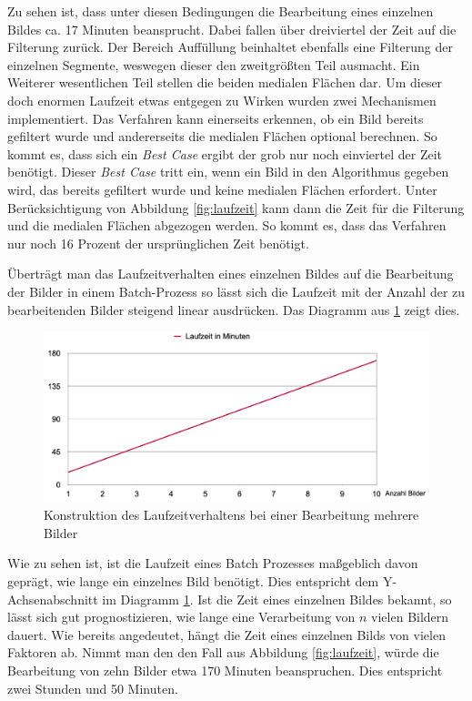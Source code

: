 Zu sehen ist, dass unter diesen Bedingungen die Bearbeitung eines einzelnen
Bildes ca. 17 Minuten beansprucht. Dabei fallen über dreiviertel der Zeit auf
die Filterung zurück. Der Bereich Auffüllung beinhaltet ebenfalls eine Filterung
der einzelnen Segmente, weswegen dieser den zweitgrößten Teil ausmacht. Ein Weiterer
wesentlichen Teil stellen die beiden medialen Flächen dar. Um dieser doch
enormen Laufzeit etwas entgegen zu Wirken wurden zwei Mechanismen implementiert.
Das Verfahren kann einerseits erkennen, ob ein Bild bereits gefiltert wurde und
andererseits die medialen Flächen optional berechnen. So kommt es, dass sich ein
\textit{Best Case} ergibt der grob nur noch einviertel der Zeit benötigt. Dieser
\textit{Best Case} tritt ein, wenn ein Bild in den Algorithmus gegeben wird, das
bereits gefiltert wurde und keine medialen Flächen erfordert. Unter
Berücksichtigung von Abbildung \ref{fig:laufzeit} kann dann die Zeit für die
Filterung und die medialen Flächen abgezogen werden. So kommt es, dass das
Verfahren nur noch 16 Prozent der ursprünglichen Zeit benötigt.

Überträgt man das Laufzeitverhalten eines einzelnen Bildes auf die Bearbeitung
der Bilder in einem Batch-Prozess so lässt sich die Laufzeit mit der Anzahl der
zu bearbeitenden Bilder steigend linear ausdrücken. Das Diagramm aus \ref{fig:laufzeit_batch}
zeigt dies.

\begin{figure}[h]
	\centering
	\includegraphics[width=1\textwidth]{img/runtimeBatch.png}
	\caption{Konstruktion des Laufzeitverhaltens bei einer Bearbeitung mehrere
	Bilder}
	\label{fig:laufzeit_batch}
\end{figure}

Wie zu sehen ist, ist die Laufzeit eines Batch Prozesses maßgeblich davon geprägt,
wie lange ein einzelnes Bild benötigt. Dies entspricht dem Y-Achsenabschnitt im Diagramm
\ref{fig:laufzeit_batch}. Ist die Zeit eines einzelnen Bildes bekannt, so lässt sich
gut prognostizieren, wie lange eine Verarbeitung von $n$ vielen Bildern dauert. Wie
bereits angedeutet, hängt die Zeit eines einzelnen Bilds von vielen Faktoren ab.
Nimmt man den den Fall aus Abbildung \ref{fig:laufzeit}, würde die Bearbeitung
von zehn Bilder etwa 170 Minuten beanspruchen. Dies entspricht zwei Stunden und 50
Minuten.

